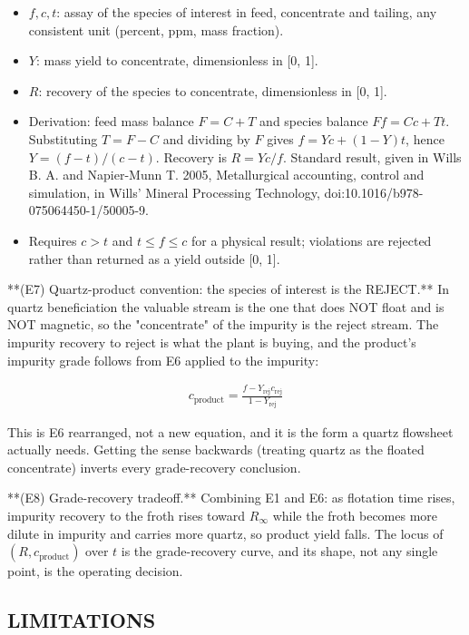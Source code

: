 \documentclass[10pt,a4paper,twoside]{report}
\begin{document}
\begin{itemize}
\item $f, c, t$: assay of the species of interest in feed, concentrate and tailing, any consistent unit (percent, ppm, mass fraction).
\item $Y$: mass yield to concentrate, dimensionless in [0, 1].
\item $R$: recovery of the species to concentrate, dimensionless in [0, 1].
\item Derivation: feed mass balance $F = C + T$ and species balance $Ff = Cc + Tt$. Substituting $T = F - C$ and dividing by $F$ gives $f = Yc + (1 - Y)t$, hence $Y = (f - t)/(c - t)$. Recovery is $R = Yc/f$. Standard result, given in Wills B. A. and Napier-Munn T. 2005, Metallurgical accounting, control and simulation, in Wills' Mineral Processing Technology, doi:10.1016/b978-075064450-1/50005-9.
\item Requires $c > t$ and $t \le f \le c$ for a physical result; violations are rejected rather than returned as a yield outside [0, 1].
\end{itemize}

**(E7) Quartz-product convention: the species of interest is the REJECT.** In quartz beneficiation the valuable stream is the one that does NOT float and is NOT magnetic, so the "concentrate" of the impurity is the reject stream. The impurity recovery to reject is what the plant is buying, and the product's impurity grade follows from E6 applied to the impurity:

\begin{equation*}
\begin{gathered}
c_{\text{product}} = \frac{f - Y_{\text{rej}} c_{\text{rej}}} {1 - Y_{\text{rej}}}
\end{gathered}
\end{equation*}

This is E6 rearranged, not a new equation, and it is the form a quartz flowsheet actually needs. Getting the sense backwards (treating quartz as the floated concentrate) inverts every grade-recovery conclusion.

**(E8) Grade-recovery tradeoff.** Combining E1 and E6: as flotation time rises, impurity recovery to the froth rises toward $R_{\infty}$ while the froth becomes more dilute in impurity and carries more quartz, so product yield falls. The locus of $(R, c_{\text{product}})$ over $t$ is the grade-recovery curve, and its shape, not any single point, is the operating decision.

\subsection*{LIMITATIONS}
\end{document}
